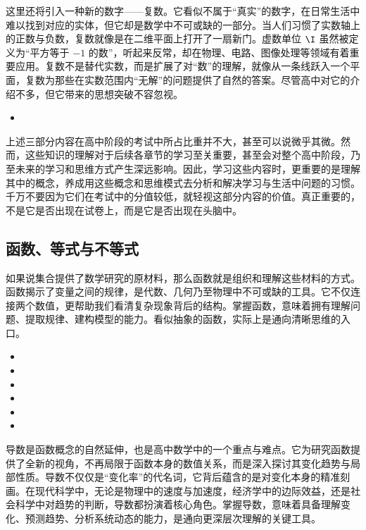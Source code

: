 这里还将引入一种新的数字——复数。它看似不属于“真实”的数字，在日常生活中难以找到对应的实体，但它却是数学中不可或缺的一部分。当人们习惯了实数轴上的正数与负数，复数就像是在二维平面上打开了一扇新门。虚数单位 $\I$ 虽然被定义为“平方等于 $-1$ 的数”，听起来反常，却在物理、电路、图像处理等领域有着重要应用。复数不是替代实数，而是扩展了对“数”的理解，就像从一条线跃入一个平面，复数为那些在实数范围内“无解”的问题提供了自然的答案。尽管高中对它的介绍不多，但它带来的思想突破不容忽视。

\begin{itemize}
\item {}
\end{itemize}

上述三部分内容在高中阶段的考试中所占比重并不大，甚至可以说微乎其微。然而，这些知识的理解对于后续各章节的学习至关重要，甚至会对整个高中阶段，乃至未来的学习和思维方式产生深远影响。因此，学习这些内容时，更重要的是理解其中的概念，养成用这些概念和思维模式去分析和解决学习与生活中问题的习惯。千万不要因为它们在考试中的分值较低，就轻视这部分内容的价值。真正重要的，不是它是否出现在试卷上，而是它是否出现在头脑中。

\subsection{函数、等式与不等式}

如果说集合提供了数学研究的原材料，那么函数就是组织和理解这些材料的方式。函数揭示了变量之间的规律，是代数、几何乃至物理中不可或缺的工具。它不仅连接两个数值，更帮助我们看清复杂现象背后的结构。掌握函数，意味着拥有理解问题、提取规律、建构模型的能力。看似抽象的函数，实际上是通向清晰思维的入口。

\begin{itemize}
\item {}
\item {}
\item {}
\item {}
\item {}
\item {}
\end{itemize}

导数是函数概念的自然延伸，也是高中数学中的一个重点与难点。它为研究函数提供了全新的视角，不再局限于函数本身的数值关系，而是深入探讨其变化趋势与局部性质。导数不仅仅是“变化率”的代名词，它背后蕴含的是对变化本身的精准刻画。在现代科学中，无论是物理中的速度与加速度，经济学中的边际效益，还是社会科学中对趋势的判断，导数都扮演着核心角色。掌握导数，意味着具备理解变化、预测趋势、分析系统动态的能力，是通向更深层次理解的关键工具。

